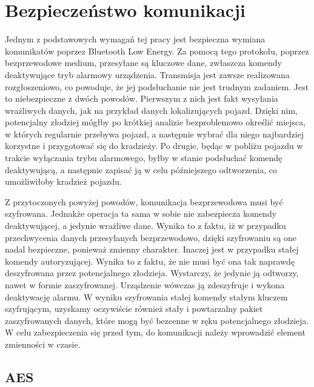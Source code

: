 \chapter{Bezpieczeństwo komunikacji}
\label{ch:communication security}

Jednym z podstawowych wymagań tej pracy jest bezpieczna wymiana komunikatów poprzez Bluetooth Low Energy. Za pomocą tego protokołu, poprzez bezprzewodowe medium, przesyłane są kluczowe dane, zwłaszcza komendy deaktywujące tryb alarmowy urządzenia. Transmisja jest zawsze realizowana rozgłoszeniowo, co powoduje, że jej podsłuchanie nie jest trudnym zadaniem. Jest to niebezpieczne z dwóch powodów. Pierwszym z nich jest fakt wysyłania wrażliwych danych, jak na przykład danych lokalizujących pojazd. Dzięki nim, potencjalny złodziej mógłby po krótkiej analizie bezproblemowo określić miejsca, w których regularnie przebywa pojazd, a następnie wybrać dla niego najbardziej korzystne i przygotować się do kradzieży. Po drugie, będąc w pobliżu pojazdu w trakcie wyłączania trybu alarmowego, byłby w stanie podsłuchać komendę deaktywującą, a następnie zapisać ją w celu późniejszego odtworzenia, co umożliwiłoby kradzież pojazdu.

Z przytoczonych powyżej powodów, komunikacja bezprzewodowa musi być szyfrowana. Jednakże operacja ta sama w sobie nie zabezpiecza komendy deaktywującej, a jedynie wrażliwe dane. Wynika to z faktu, iż w przypadku przechwycenia danych przesyłanych bezprzewodowo, dzięki szyfrowaniu są one nadal bezpieczne, ponieważ zmienny charakter. Inaczej jest w przypadku stałej komendy autoryzującej. Wynika to z faktu, że nie musi być ona tak naprawdę deszyfrowana przez potencjalnego złodzieja. Wystarczy, że jedynie ją odtworzy, nawet w formie zaszyfrowanej. Urządzenie wówczas ją zdeszyfruje i wykona deaktywację alarmu. W wyniku szyfrowania stałej komendy stałym kluczem szyfrującym, uzyskamy oczywiście również stały i powtarzalny pakiet zaszyfrowanych danych, które mogą być bezcenne w ręku potencjalnego złodzieja. W celu zabezpieczenia się przed tym, do komunikacji należy wprowadzić element zmienności w czasie.  

\section{AES}

